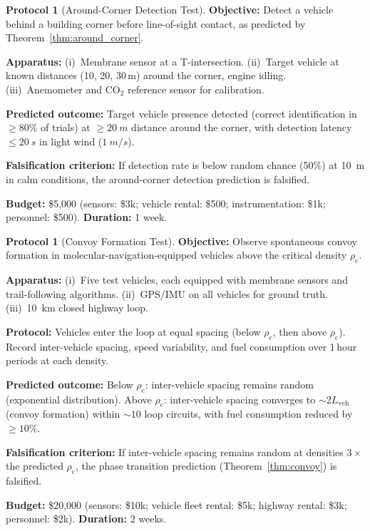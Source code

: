 \documentclass[11pt,twocolumn,a4paper]{article}
\theoremstyle{plain}
\theoremstyle{definition}
\newtheorem{protocol}[theorem]{Protocol}
\theoremstyle{remark}
\newcommand{\rhoc}{\rho_{\mathrm{c}}}
\begin{document}
\begin{protocol}[Around-Corner Detection Test]
\label{prot:around_corner}
\textbf{Objective:} Detect a vehicle behind a building corner before line-of-sight contact, as predicted by Theorem~\ref{thm:around_corner}.

\textbf{Apparatus:} (i)~Membrane sensor at a T-intersection. (ii)~Target vehicle at known distances (10, 20, 30\,m) around the corner, engine idling. (iii)~Anemometer and CO$_2$ reference sensor for calibration.

\textbf{Predicted outcome:} Target vehicle presence detected (correct identification in $\geq 80\%$ of trials) at $\geq \SI{20}{m}$ distance around the corner, with detection latency $\leq \SI{20}{s}$ in light wind ($\SI{1}{m/s}$).

\textbf{Falsification criterion:} If detection rate is below random chance (50\%) at \SI{10}{m} in calm conditions, the around-corner detection prediction is falsified.

\textbf{Budget:} \$5{,}000 (sensors: \$3k; vehicle rental: \$500; instrumentation: \$1k; personnel: \$500). \textbf{Duration:} 1 week.
\end{protocol}

\begin{protocol}[Convoy Formation Test]
\label{prot:convoy}
\textbf{Objective:} Observe spontaneous convoy formation in molecular-navigation-equipped vehicles above the critical density $\rhoc$.

\textbf{Apparatus:} (i)~Five test vehicles, each equipped with membrane sensors and trail-following algorithms. (ii)~GPS/IMU on all vehicles for ground truth. (iii)~\SI{10}{km} closed highway loop.

\textbf{Protocol:} Vehicles enter the loop at equal spacing (below $\rhoc$, then above $\rhoc$). Record inter-vehicle spacing, speed variability, and fuel consumption over 1\,hour periods at each density.

\textbf{Predicted outcome:} Below $\rhoc$: inter-vehicle spacing remains random (exponential distribution). Above $\rhoc$: inter-vehicle spacing converges to $\sim 2 L_{\mathrm{veh}}$ (convoy formation) within $\sim 10$ loop circuits, with fuel consumption reduced by $\geq 10\%$.

\textbf{Falsification criterion:} If inter-vehicle spacing remains random at densities $3\times$ the predicted $\rhoc$, the phase transition prediction (Theorem~\ref{thm:convoy}) is falsified.

\textbf{Budget:} \$20{,}000 (sensors: \$10k; vehicle fleet rental: \$5k; highway rental: \$3k; personnel: \$2k). \textbf{Duration:} 2 weeks.
\end{protocol}
\end{document}
